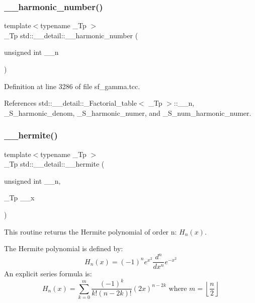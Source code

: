 \subsubsection{\texorpdfstring{\+\_\+\+\_\+harmonic\+\_\+number()}{\_\_harmonic\_number()}}
{\footnotesize\ttfamily template$<$typename \+\_\+\+Tp $>$ \\
\+\_\+\+Tp std\+::\+\_\+\+\_\+detail\+::\+\_\+\+\_\+harmonic\+\_\+number (\begin{DoxyParamCaption}\item[{unsigned int}]{\+\_\+\+\_\+n }\end{DoxyParamCaption})}



Definition at line 3286 of file sf\+\_\+gamma.\+tcc.



References std\+::\+\_\+\+\_\+detail\+::\+\_\+\+Factorial\+\_\+table$<$ \+\_\+\+Tp $>$\+::\+\_\+\+\_\+n, \+\_\+\+S\+\_\+harmonic\+\_\+denom, \+\_\+\+S\+\_\+harmonic\+\_\+numer, and \+\_\+\+S\+\_\+num\+\_\+harmonic\+\_\+numer.

\mbox{\label{namespacestd_1_1____detail_aeb57881dd224320629e184c9118c910b}} 
\subsubsection{\texorpdfstring{\+\_\+\+\_\+hermite()}{\_\_hermite()}}
{\footnotesize\ttfamily template$<$typename \+\_\+\+Tp $>$ \\
\+\_\+\+Tp std\+::\+\_\+\+\_\+detail\+::\+\_\+\+\_\+hermite (\begin{DoxyParamCaption}\item[{unsigned int}]{\+\_\+\+\_\+n,  }\item[{\+\_\+\+Tp}]{\+\_\+\+\_\+x }\end{DoxyParamCaption})}



This routine returns the Hermite polynomial of order n\+: $ H_n(x) $. 

The Hermite polynomial is defined by\+: \[ H_n(x) = (-1)^n e^{x^2} \frac{d^n}{dx^n} e^{-x^2} \] An explicit series formula is\+: \[ H_n(x) = \sum_{k=0}^{m} \frac{(-1)^k}{k!(n-2k)!}(2x)^{n-2k} \mbox{ where } m = \left\lfloor{\frac{n}{2}}\right\rfloor \]

